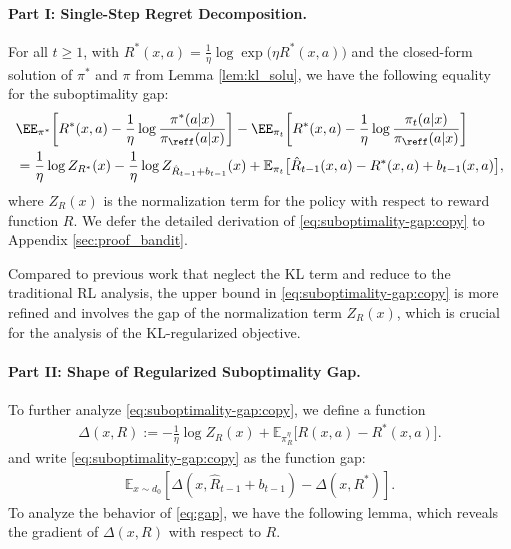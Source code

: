 \documentclass[11pt]{article}
\newcommand{\rE}{\mathbb E}
\newcommand{\E}{\mathbb E}
\begin{document}
\paragraph{Part I: Single-Step Regret Decomposition.}
For all $t \ge 1$, with $R^*(x,a) = \frac{1}{\eta}\log \exp \big(\eta R^*(x,a)\big)$ and the closed-form solution of $\pi^*$ and $\pi$ from Lemma \ref{lem:kl_solu}, we have the following equality for the suboptimality gap: 
\begin{equation}
\begin{aligned}
&\EE_{\pi^*} \bigg[R^*(x,a) - \frac{1}{\eta}\log\frac{\pi^*(a|x)}{\pi_{\reff}(a|x)}\bigg]  - \EE_{\pi_{t}} \bigg[R^*(x, a) - \frac{1}{\eta}\log \frac{\pi_{t}(a|x)}{\pi_{\reff}(a|x)}\bigg]
    \\
    &= \frac{1}{\eta} \log Z_{R^*}(x) - \frac{1}{\eta} \log Z_{\hat R_{t - 1} + b_{t - 1} }(x) + \rE_{\pi_{t}} \big[\hat R_{t - 1}(x, a) - R^*(x, a) + b_{t-1}(x, a)\big],
    \label{eq:suboptimality-gap:copy}
\end{aligned}
\end{equation}
where $Z_R(x)$ is the normalization term for the policy with respect to reward function $R$. We defer the detailed derivation of \eqref{eq:suboptimality-gap:copy} to Appendix \ref{sec:proof_bandit}.

\begin{remark}
    Compared to previous work \citep{xiong2024iterative, xie2024exploratory,ye2024theoretical} that neglect the KL term and reduce to the traditional RL analysis, the upper bound in \eqref{eq:suboptimality-gap:copy} is more refined and involves the gap of the normalization term $Z_R(x)$, which is crucial for the analysis of the KL-regularized objective.
\end{remark}

\paragraph{Part II: Shape of Regularized Suboptimality Gap.}
To further analyze \eqref{eq:suboptimality-gap:copy}, we define a function 
\begin{equation}
    \begin{aligned}
        \Delta(x,R) := - \frac{1}{\eta} \log Z_R(x) + \E_{\pi_R^\eta} \big[R(x,a) - R^*(x,a)\big].
        \label{eq:delta-R:copy}
    \end{aligned}  
\end{equation} 
and write \eqref{eq:suboptimality-gap:copy} as the function gap:
\begin{equation}\label{eq:gap}
    \begin{aligned}
        \rE_{x \sim d_0}[\Delta(x, \hat R_{t - 1} + b_{t - 1}) - \Delta(x, R^*)].
    \end{aligned}  
\end{equation} 
To analyze the behavior of \eqref{eq:gap}, we have the following lemma, which reveals the gradient of $\Delta(x,R)$ with respect to $R$.
\end{document}
